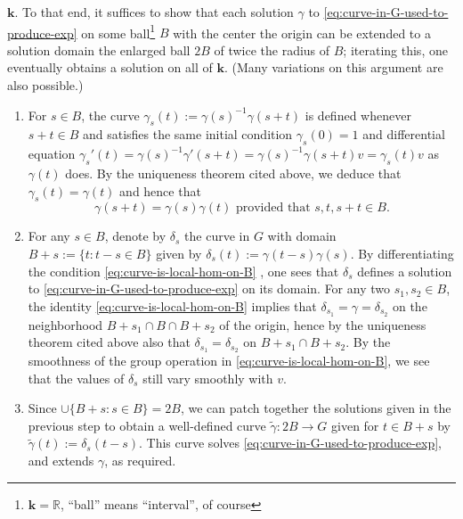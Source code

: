 \documentclass[reqno]{amsart} 
\begin{document}
\begin{enumerate}
  $\mathbf{k}$.  To that end, it suffices to show
  that each solution
  $\gamma$ to
  \eqref{eq:curve-in-G-used-to-produce-exp} 
  on some
  ball\footnote{$\mathbf{k} = \mathbb{R}$, ``ball'' means
    ``interval'', of course} $B$ with the center the origin 
  can be extended to a solution domain the enlarged ball $2 B$ of twice the
  radius of $B$; iterating this, one eventually obtains a solution on all of $\mathbf{k}$.
  (Many variations on this argument are also possible.)
  \begin{enumerate}
  \item For $s \in B$, the curve
    $\gamma_s(t) := \gamma(s)^{-1} \gamma(s + t)$ is defined
    whenever $s+t \in B$ and satisfies the
    same initial condition $\gamma_s(0) = 1$ and differential
    equation
    $\gamma_s'(t) = \gamma(s)^{-1} \gamma'(s + t) = \gamma(s)^{-1}
    \gamma(s+t) v = \gamma_s(t) v$
    as $\gamma(t)$ does.
    By the uniqueness theorem cited above,
    we deduce that
    $\gamma_s(t) = \gamma(t)$
    and hence that 
    \begin{equation}\label{eq:curve-is-local-hom-on-B}
      \gamma(s+t) = \gamma(s) \gamma(t) \text{ provided that }s,t, s+t
      \in B.
    \end{equation}
  \item For any $s \in B$, denote by $\delta_s$ the curve in $G$
    with domain $B + s := \{t : t - s \in B\}$ given by
    $\delta_s(t) := \gamma(t-s) \gamma(s)$.
    By differentiating
    the condition \eqref{eq:curve-is-local-hom-on-B} , one sees
    that $\delta_s$ defines a solution to
    \eqref{eq:curve-in-G-used-to-produce-exp} on its domain.  For
    any two $s_1,s_2 \in B$, the identity
    \eqref{eq:curve-is-local-hom-on-B} implies that
    $\delta_{s_1} = \gamma = \delta_{s_2}$ on the neighborhood
    $B + s_1 \cap B \cap B + s_2$ of the origin, hence by the
    uniqueness theorem cited above also that
    $\delta_{s_1} = \delta_{s_2}$ on $B+ s_1 \cap B + s_2$.  
    By the smoothness of the group operation in
    \eqref{eq:curve-is-local-hom-on-B},
    we see that the values of $\delta_s$ still vary smoothly with $v$.
  \item Since
    $\cup \{B + s : s \in B\} = 2 B$, we can patch together the solutions given in the previous
    step to obtain a well-defined curve
    $\tilde{\gamma} : 2 B \rightarrow G$ given for $t \in B+s$ by
    $\tilde{\gamma}(t) := \delta_s(t - s)$.
    This curve solves \eqref{eq:curve-in-G-used-to-produce-exp},
    and extends $\gamma$, as required.
  \end{enumerate}
\end{enumerate}
\end{document}
